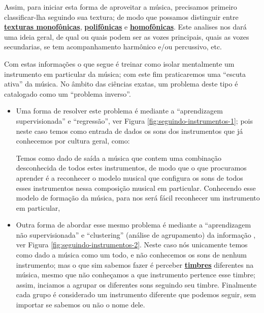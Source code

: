Assim, para iniciar esta forma de aproveitar a música, precisamos primeiro 
classificar-lha seguindo sua textura;
de modo que possamos distinguir entre
\hyperref[subsec:monofonica]{\textbf{texturas monofônicas}}, 
\hyperref[subsec:polifonica]{\textbf{polifônicas}} e
\hyperref[subsec:homofonica]{\textbf{homofônicas}}. 
Este analises nos dará uma ideia geral, 
de qual ou quais podem ser as vozes principais, quais as vozes secundarias,
se tem acompanhamento harmônico e/ou percussivo, etc.

Com estas informações o que segue é treinar como isolar mentalmente 
um instrumento em particular da música;
com este fim praticaremos uma ``escuta ativa'' da música. 
No âmbito das ciências exatas, um problema deste tipo é catalogado como um ``problema inverso''.
\begin{itemize}
\item Uma forma de resolver este problema é mediante a ``aprendizagem supervisionada'' 
e ``regressão'', ver Figura \ref{fig:seguindo-instrumentos-1};
pois neste caso temos como entrada de dados os sons dos instrumentos que já conhecemos por cultura geral,
como: 
Temos como dado de saída a música que contem uma combinação desconhecida de todos estes instrumentos,
de modo que o que procuramos aprender é a reconhecer o modelo musical 
que configura os sons de todos esses instrumentos
nessa composição musical em particular.
Conhecendo esse modelo de formação da música, 
para nos será fácil reconhecer um instrumento em particular,

\item Outra forma de abordar esse mesmo problema é mediante a ``aprendizagem não supervisionada'' 
e ``clustering'' (análise de agrupamento) da informação , ver Figura \ref{fig:seguindo-instrumentos-2}.
Neste caso nós unicamente temos como dado a música como um todo,
e não conhecemos os sons de nenhum instrumento;
mas o que sim sabemos fazer é perceber 
\hyperref[sec:pos:timbre]{\textbf{timbres}} diferentes na música,
mesmo que não conheçamos a que instrumento pertence esse timbre;
assim, inciamos a agrupar os diferentes sons seguindo seu timbre.
Finalmente cada grupo é considerado um instrumento diferente que podemos seguir,
sem importar se sabemos ou não o nome dele.
\end{itemize}
